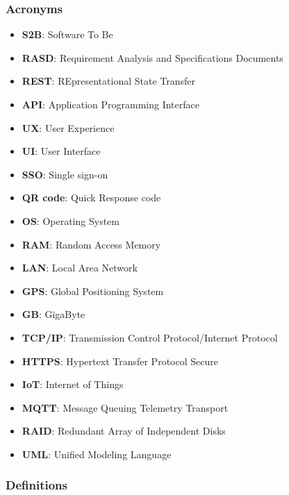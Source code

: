 \subsubsection{Acronyms}

\begin{itemize}
    \item \textbf{S2B}: Software To Be
    \item \textbf{RASD}: Requirement Analysis and Specifications Documents
    \item \textbf{REST}: REpresentational State Transfer
    \item \textbf{API}: Application Programming Interface
    \item \textbf{UX}: User Experience
    \item \textbf{UI}: User Interface
    \item \textbf{SSO}: Single sign-on
    \item \textbf{QR code}: Quick Response code
    \item \textbf{OS}: Operating System
    \item \textbf{RAM}: Random Access Memory
    \item \textbf{LAN}: Local Area Network
    \item \textbf{GPS}: Global Positioning System
    \item \textbf{GB}: GigaByte
    \item \textbf{TCP/IP}: Transmission Control Protocol/Internet Protocol
    \item \textbf{HTTPS}: Hypertext Transfer Protocol Secure
    \item \textbf{IoT}: Internet of Things
    \item \textbf{MQTT}: Message Queuing Telemetry Transport
    \item \textbf{RAID}: Redundant Array of Independent Disks
    \item \textbf{UML}: Unified Modeling Language

\end{itemize}

\vfill
\pagebreak

\subsubsection{Definitions}

